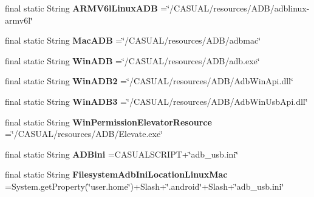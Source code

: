 \begin{DoxyCompactItemize}
\item 
\hypertarget{classCASUAL_1_1Statics_acc3bb0c8ecd585f668386119f48c9573}{final static String {\bfseries A\-R\-M\-V6l\-Linux\-A\-D\-B} =\char`\"{}/C\-A\-S\-U\-A\-L/resources/A\-D\-B/adblinux-\/armv6l\char`\"{}}\label{classCASUAL_1_1Statics_acc3bb0c8ecd585f668386119f48c9573}

\item 
\hypertarget{classCASUAL_1_1Statics_a3162ee00f74b4a7770502a726cbe1db1}{final static String {\bfseries Mac\-A\-D\-B} =\char`\"{}/C\-A\-S\-U\-A\-L/resources/A\-D\-B/adbmac\char`\"{}}\label{classCASUAL_1_1Statics_a3162ee00f74b4a7770502a726cbe1db1}

\item 
\hypertarget{classCASUAL_1_1Statics_ad35df73c3be77bc18f116b74679d54de}{final static String {\bfseries Win\-A\-D\-B} =\char`\"{}/C\-A\-S\-U\-A\-L/resources/A\-D\-B/adb.\-exe\char`\"{}}\label{classCASUAL_1_1Statics_ad35df73c3be77bc18f116b74679d54de}

\item 
\hypertarget{classCASUAL_1_1Statics_a520d0f4253816d65e5a7ee83adc90d9e}{final static String {\bfseries Win\-A\-D\-B2} =\char`\"{}/C\-A\-S\-U\-A\-L/resources/A\-D\-B/Adb\-Win\-Api.\-dll\char`\"{}}\label{classCASUAL_1_1Statics_a520d0f4253816d65e5a7ee83adc90d9e}

\item 
\hypertarget{classCASUAL_1_1Statics_adcb2237a9e692dc38f4f73a9dae8e74b}{final static String {\bfseries Win\-A\-D\-B3} =\char`\"{}/C\-A\-S\-U\-A\-L/resources/A\-D\-B/Adb\-Win\-Usb\-Api.\-dll\char`\"{}}\label{classCASUAL_1_1Statics_adcb2237a9e692dc38f4f73a9dae8e74b}

\item 
\hypertarget{classCASUAL_1_1Statics_a170d71dbbba26c487be9a1e53593a2e3}{final static String {\bfseries Win\-Permission\-Elevator\-Resource} =\char`\"{}/C\-A\-S\-U\-A\-L/resources/A\-D\-B/Elevate.\-exe\char`\"{}}\label{classCASUAL_1_1Statics_a170d71dbbba26c487be9a1e53593a2e3}

\item 
\hypertarget{classCASUAL_1_1Statics_a409621bec3726357190104c07417aaf3}{final static String {\bfseries A\-D\-Bini} =C\-A\-S\-U\-A\-L\-S\-C\-R\-I\-P\-T+\char`\"{}adb\-\_\-usb.\-ini\char`\"{}}\label{classCASUAL_1_1Statics_a409621bec3726357190104c07417aaf3}

\item 
\hypertarget{classCASUAL_1_1Statics_ab91d75b9ef93fbf7e5f9499cb768fd43}{final static String {\bfseries Filesystem\-Adb\-Ini\-Location\-Linux\-Mac} =System.\-get\-Property(\char`\"{}user.\-home\char`\"{})+Slash+\char`\"{}.android\char`\"{}+Slash+\char`\"{}adb\-\_\-usb.\-ini\char`\"{}}\label{classCASUAL_1_1Statics_ab91d75b9ef93fbf7e5f9499cb768fd43}


\end{DoxyCompactItemize}
